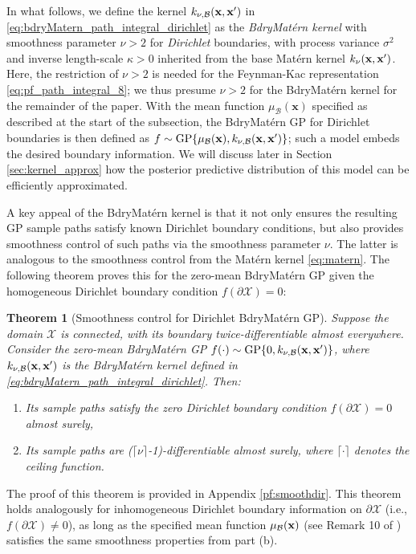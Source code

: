 \documentclass[aos,preprint]{imsart}
\theoremstyle{plain}
\newtheorem{theorem}{Theorem}[section]
\newcommand{\CalX}{\mathcal X}
\newcommand{\Bx}{\bold x}
\newcommand{\BFx}{\bold x}
\theoremstyle{remark}
\begin{document}
In what follows, we define the kernel $k_{\nu,\mathcal{B}}(\BFx, \BFx')$ in \eqref{eq:bdryMatern_path_integral_dirichlet} as the \textit{BdryMat\'ern kernel} with smoothness parameter $\nu > 2$ for \textit{Dirichlet} boundaries, with process variance $\sigma^2$ and inverse length-scale $\kappa > 0$ inherited from the base Mat\'ern kernel $k_\nu(\BFx, \BFx')$. Here, the restriction of $\nu > 2$ is needed for the Feynman-Kac representation \eqref{eq:pf_path_integral_8}; we thus presume $\nu > 2$ for the BdryMat\'ern kernel for the remainder of the paper. With the mean function $\mu_{\mathcal{B}}(\mathbf{x})$ specified as described at the start of the subsection, the BdryMat\'ern GP for Dirichlet boundaries is then defined as $f \sim \text{GP}\{\mu_{\mathcal{B}}(\mathbf{x}),k_{\nu,\mathcal{B}}(\BFx, \BFx')\}$; such a model embeds the desired boundary information. We will discuss later in Section \ref{sec:kernel_approx} how the posterior predictive distribution of this model can be efficiently approximated.


A key appeal of the BdryMat\'ern kernel is that it not only ensures the resulting GP sample paths satisfy known Dirichlet boundary conditions, but also provides smoothness control of such paths via the smoothness parameter $\nu$. The latter is analogous to the smoothness control from the Mat\'ern kernel \eqref{eq:matern}. The following theorem proves this for the zero-mean BdryMat\'ern GP given the homogeneous Dirichlet boundary condition $f(\partial \mathcal{X}) = 0$:
\begin{theorem}[Smoothness control for Dirichlet BdryMat\'ern GP]
Suppose the domain $\CalX$ is connected, with its boundary twice-differentiable almost everywhere. Consider the zero-mean BdryMat\'ern GP $f(\cdot) \sim \textup{GP}\{0,k_{\nu,\mathcal{B}}(\BFx, \BFx')\}$, where $k_{\nu,\mathcal{B}}(\BFx, \BFx')$ is the BdryMat\'ern kernel defined in \eqref{eq:bdryMatern_path_integral_dirichlet}. Then:
\begin{enumerate}[label=(\alph*)]
    \item Its sample paths satisfy the zero Dirichlet boundary condition $f(\partial \mathcal{X}) = 0$ almost surely,
    \item Its sample paths are \textup{($\lceil\nu\rceil$-1)}-differentiable almost surely, where $\lceil\cdot\rceil$ denotes the ceiling function.
\end{enumerate}
\label{thm:smoothdir}
\end{theorem}
\noindent The proof of this theorem is provided in Appendix \ref{pf:smoothdir}. This theorem holds analogously for inhomogeneous Dirichlet boundary information on $\partial \mathcal{X}$ (i.e., $f(\partial \mathcal{X}) \neq 0$), as long as the specified mean function $\mu_{\mathcal{B}}(\Bx)$ (see Remark 10 of \cite{dalton2024boundary}) satisfies the same smoothness properties from part (b).
\end{document}
